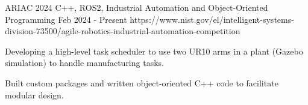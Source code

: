 \begin{project}
  {ARIAC 2024}
  {C++, ROS2, Industrial Automation and Object-Oriented Programming}
  {Feb 2024 - Present}
  {https://www.nist.gov/el/intelligent-systems-division-73500/agile-robotics-industrial-automation-competition}

  \item Developing a high-level task scheduler to use two UR10 arms in a plant (Gazebo simulation)
        to handle manufacturing tasks.

  \item Built custom packages and written object-oriented C++ code to facilitate modular design.


\end{project}
